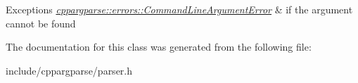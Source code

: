 \begin{DoxyExceptions}{Exceptions}
{\em \hyperlink{classcppargparse_1_1errors_1_1CommandLineArgumentError}{cppargparse\+::errors\+::\+Command\+Line\+Argument\+Error}} & if the argument cannot be found \\
\hline
\end{DoxyExceptions}


The documentation for this class was generated from the following file\+:\begin{DoxyCompactItemize}
\item 
include/cppargparse/parser.\+h\end{DoxyCompactItemize}
